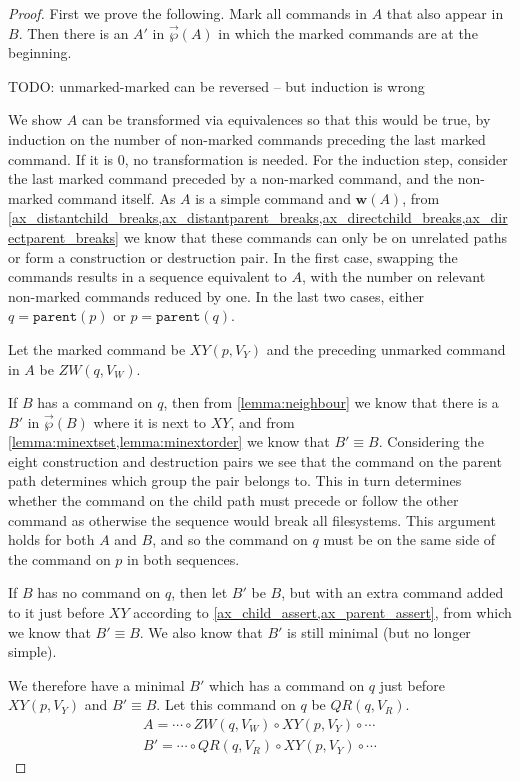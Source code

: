 \documentclass[12pt]{article}
\newcommand{\parent}{\mathtt{parent}}
\newcommand{\fscommand}[2]{{#1#2}}
\newcommand{\cxy}{\fscommand{X}{Y}}
\newcommand{\czw}{\fscommand{Z}{W}}
\newcommand{\cqr}{\fscommand{Q}{R}}
\newcommand{\cc}{\circ}
\newcommand{\works}[1]{{\mathbf{w}}({#1})}
\newcommand{\orderset}[1]{\vec{\wp}({#1})}
\theoremstyle{definition}
\begin{document}
\begin{proof}
First we prove the following.
Mark all commands in $A$ that also appear in $B$.
Then there is an $A'$ in $\orderset{A}$ in which the marked commands are at the beginning.

\medskip

TODO: unmarked-marked can be reversed -- but induction is wrong

We show $A$ can be transformed via equivalences so that this would be true,
by induction on the number of non-marked commands preceding the last marked command.
If it is 0, no transformation is needed.
For the induction step, consider the last marked command preceded by a non-marked command,
and the non-marked command itself.
As $A$ is a simple command and $\works{A}$, from 
\cref{ax_distantchild_breaks,ax_distantparent_breaks,ax_directchild_breaks,ax_directparent_breaks}
we know that these commands can only be on unrelated paths or form a construction or destruction pair.
In the first case, swapping the commands results in a sequence equivalent to $A$,
with the number on relevant non-marked commands reduced by one.
In the last two cases,
either $q=\parent(p)$ or $p=\parent(q)$.

Let the marked command be $\cxy(p, V_Y)$ and the preceding unmarked command in $A$ be $\czw(q, V_W)$.

If $B$ has a command on $q$, then
from \cref{lemma:neighbour}
we know that there is a $B'$ in $\orderset{B}$ where it is next to $\cxy$,
and from \cref{lemma:minextset,lemma:minextorder} we know that $B'\equiv B$.
Considering the eight construction and destruction pairs we see that the command
on the parent path determines which group the pair belongs to.
This in turn determines whether the command on the child path must
precede or follow the other command as otherwise the sequence would break all filesystems.
This argument holds for both $A$ and $B$, and so the command on $q$ must be on
the same side of the command on $p$ in both sequences.

If $B$ has no command on $q$, then let $B'$ be $B$, but with an extra command added to it just before $\cxy$
according to \cref{ax_child_assert,ax_parent_assert}, from which we know
that $B'\equiv B$.
We also know that $B'$ is still minimal (but no longer simple).

We therefore have a minimal $B'$ which has a command on $q$ just before $\cxy(p, V_Y)$ and $B'\equiv B$.
Let this command on $q$ be $\cqr(q, V_R)$.
\begin{gather*}
A = \cdots\cc  \czw(q, V_W)\cc  \cxy(p, V_Y)\cc  \cdots \\
B' = \cdots\cc  \cqr(q, V_R)\cc  \cxy(p, V_Y)\cc  \cdots
\end{gather*}


\end{proof}
\end{document}
